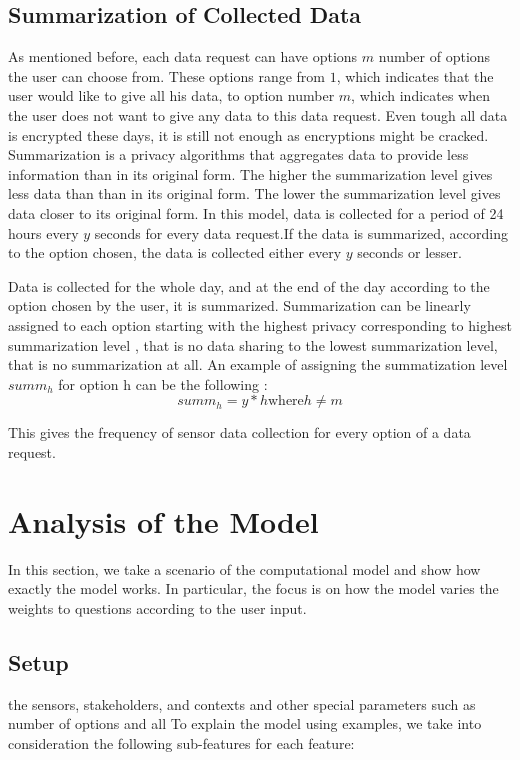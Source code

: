 \subsection{Summarization of Collected Data} \label{summa}
As mentioned before, each data request can have options $m$ number of options the user can choose from. These options range from $1$, which indicates that the user would like to give all his data, to option number $m$, which indicates when the user does not want to give any data to this data request. Even tough all data is encrypted these days, it is still not enough as encryptions might be cracked. Summarization is a privacy algorithms that aggregates data to provide less information than in its original form. The higher the summarization level gives less data than than in its original form. The lower the summarization level gives data closer to its original form. In this model, data is collected for a period of 24 hours every $y$ seconds for every data request.If the data is summarized, according to the option chosen, the data is collected either every $y$ seconds or lesser.

Data is collected for the whole day, and at the end of the day according to the option chosen by the user, it is summarized. Summarization can
be linearly assigned to each option starting with the highest privacy corresponding to highest summarization level , that is no data sharing to
the lowest summarization level, that is no summarization at all. An example of assigning the summatization level $summ_{h}$ for option h can be the following :
\begin{equation}
summ_{h} = y*h \text{where} h \neq m
\end{equation}

This gives the frequency of sensor data collection for every option of a data request.

\section{Analysis of the Model} \label{analysis_model}
In this section, we take a scenario of the computational model and show how exactly the model works. In particular, the focus is 
on how the model varies the weights to questions according to the user input.

\subsection{Setup}
the sensors, stakeholders, and contexts and other special parameters such as number of options and all
To explain the model using examples, we take into consideration the following sub-features for each feature:

